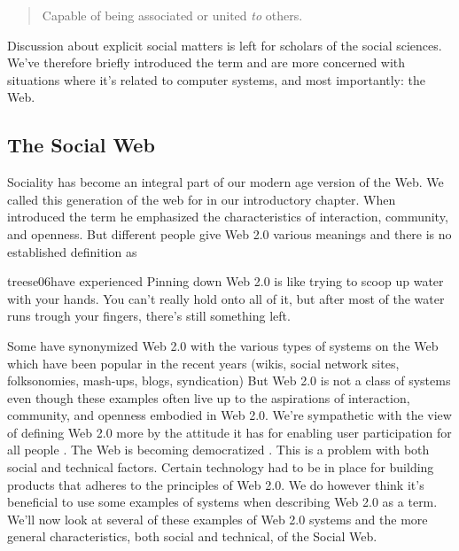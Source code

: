 \begin{quote}
  Capable of being associated or united \emph{to} others.
\end{quote}

Discussion about explicit social matters is left for scholars of the social
sciences. We've therefore briefly introduced the term and are more concerned
with situations where it's related to computer systems, and most importantly:
the Web.

\subsection{The Social Web}
\label{section:background.sociality.the.social.web}

Sociality has become an integral part of our modern age version of the Web.
We called this generation of the web for %
in our introductory chapter. When \citet{oreilly05} introduced the term he
emphasized the characteristics of interaction, community, and openness.
But different people give Web 2.0 various meanings and there is no
established definition as
\begin{fullquote}[\p{15}]{treese06}{have experienced}
  Pinning down Web 2.0 is like trying to scoop up water with your hands. You
  can't really hold onto all of it, but after most of the water runs trough
  your fingers, there's still something left.
\end{fullquote}

Some have synonymized Web 2.0 with the various types of systems on the
Web which have been popular in the recent years
(wikis, social network sites, folksonomies, mash-ups, blogs, syndication)
But Web 2.0 is not a class of systems \citep[]{millard06} even though
these examples often live up to the aspirations of interaction, community,
and openness embodied in Web 2.0. We're sympathetic with the view of defining
Web 2.0 more by the attitude it has for enabling user participation for all
people \citep[]{lin07}. The Web is becoming democratized
\citep{graham05}. This is a problem with both social and
technical factors. Certain technology had to be in place for building
products that adheres to the principles of Web 2.0. We do however think it's
beneficial to use some examples of systems when describing Web 2.0 as a term.
We'll now look at several of these examples of Web 2.0 systems and
the more general characteristics, both social and technical,
of the Social Web.

